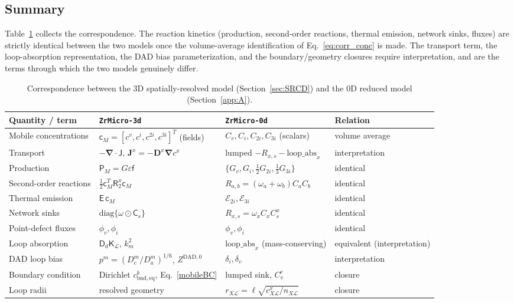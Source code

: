 \documentclass{article}
\newcommand{\spvec}[1]{\bm{\mathsf{#1}}}   %
\newcommand{\spmat}[1]{\bm{\mathsf{#1}}}   %
\begin{document}
\subsection{Summary}
Table~\ref{tab:correspondence} collects the correspondence. The reaction kinetics (production, second-order reactions, thermal emission, network sinks, fluxes) are strictly identical between the two models once the volume-average identification of Eq.~\eqref{eq:corr_conc} is made. The transport term, the loop-absorption representation, the DAD bias parameterization, and the boundary/geometry closures require interpretation, and are the terms through which the two models genuinely differ.

\begin{table}[ht]
\centering
\caption{Correspondence between the 3D spatially-resolved model (Section~\ref{sec:SRCD}) and the 0D reduced model (Section~\ref{app:A}).}
\label{tab:correspondence}
\renewcommand{\arraystretch}{1.3}
\small
\setlength{\tabcolsep}{4pt}
\begin{tabular}{p{} p{} p{} p{}}
\hline
\textbf{Quantity / term} & \textbf{\texttt{ZrMicro-3d}} & \textbf{\texttt{ZrMicro-0d}} & \textbf{Relation}\\
\hline
Mobile concentrations & $\spvec{c}_M=[c^v,c^i,c^{2i},c^{3i}]^{T}$ (fields) & $C_v,C_i,C_{2i},C_{3i}$ (scalars) & volume average \\
Transport & $-\bm\nabla\cdot\spvec{J}$, $\bm J^x=-\bm D^x\bm\nabla c^x$ & lumped $-R_{x,s}-\text{loop\_abs}_x$ & interpretation \\
Production & $\spvec{P}_M=G\varepsilon\spvec f$ & $\{G_v,G_i,\tfrac12 G_{2i},\tfrac13 G_{3i}\}$ & identical \\
Second-order reactions & $\tfrac12\spvec{c}_M^{T}\spmat{R}_2^{x}\spvec{c}_M$ & $R_{a,b}=(\omega_a+\omega_b)C_aC_b$ & identical \\
Thermal emission & $\spmat{E}\,\spvec{c}_M$ & $\mathcal E_{2i},\mathcal E_{3i}$ & identical \\
Network sinks & $\mathrm{diag}\{\spvec\omega\odot\spvec C_s\}$ & $R_{x,s}=\omega_x C_x C_s^x$ & identical \\
Point-defect fluxes & $\phi_v,\phi_i$ & $\phi_v,\phi_i$ & identical \\
Loop absorption & $\spmat{D}_d\spmat{K}_{\mathcal L}$, $k_m^2$ & $\text{loop\_abs}_x$ (mass-conserving) & equivalent (interpretation) \\
DAD loop bias & $p^m=(D_c^m/D_a^m)^{1/6}$, $Z^{\mathrm{DAD},0}$ & $\delta_i,\delta_v$ & interpretation \\
Boundary condition & Dirichlet $c^k_{\mathrm{bnd,eq}}$, Eq.~\eqref{mobileBC} & lumped sink, $C_v^e$ & closure \\
Loop radii & resolved geometry & $r_{X\mathcal L}=\ell\sqrt{c^x_{X\mathcal L}/n_{X\mathcal L}}$ & closure \\
\hline
\end{tabular}
\end{table}
\end{document}
